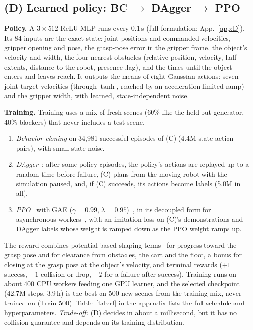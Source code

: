 \documentclass[conference]{IEEEtran}
\begin{document}
\subsection{(D) Learned policy: BC $\to$ DAgger $\to$ PPO}

\textbf{Policy.} A $3\times512$ ReLU MLP runs every 0.1\,s (full formulation: App.~\ref{app:D}). Its 84 inputs are the exact state: joint
positions and commanded velocities, gripper opening and pose, the grasp-pose error in the gripper frame,
the object's velocity and width, the four nearest obstacles (relative position, velocity, half extents,
distance to the robot, presence flag), and the times until the object enters and leaves reach. It outputs
the means of eight Gaussian actions: seven joint target velocities (through $\tanh$, reached by an
acceleration-limited ramp) and the gripper width, with learned, state-independent noise.

\textbf{Training.} Training uses a mix of fresh scenes (60\% like the held-out generator, 40\% blockers)
that never includes a test scene.
\begin{enumerate}
  \item \emph{Behavior cloning} on 34{,}981 successful episodes of (C) (4.4M state-action pairs), with
    small state noise.
  \item \emph{DAgger}~\cite{ross2011dagger}: after some policy episodes, the policy's actions are replayed
    up to a random time before failure, (C) plans from the moving robot with the simulation paused, and,
    if (C) succeeds, its actions become labels (5.0M in all).
  \item \emph{PPO}~\cite{schulman2017ppo} with GAE ($\gamma=0.99$, $\lambda=0.95$)~\cite{schulman2016gae},
    in its decoupled form for asynchronous workers~\cite{hilton2022batch}, with an imitation loss on
    (C)'s demonstrations and DAgger labels whose weight is ramped down as the PPO weight ramps up.
\end{enumerate}
The reward combines potential-based shaping terms~\cite{ng1999shaping} for progress toward the grasp pose
and for clearance from obstacles, the cart and the floor, a bonus for closing at the grasp pose at the
object's velocity, and terminal rewards ($+1$ success, $-1$ collision or drop, $-2$ for a failure after
success). Training runs on about 400 CPU workers feeding one GPU learner, and the selected checkpoint
(42.7M steps, 3.9\,h) is the best on 500 new scenes from the training mix, never trained on (Train-500). Table~\ref{tab:rl} in the
appendix lists the full schedule and hyperparameters. \emph{Trade-off:} (D) decides in about a
millisecond, but it has no collision guarantee and depends on its training distribution.
\end{document}
